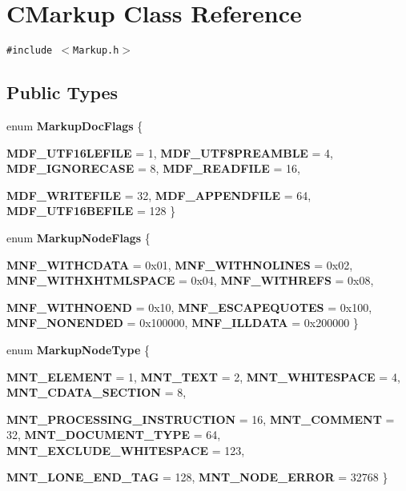 \section{CMarkup Class Reference}
\label{classCMarkup}
{\tt \#include $<$Markup.h$>$}

\subsection*{Public Types}
\begin{CompactItemize}
\item 
enum {\bf MarkupDocFlags} \{ \par
{\bf MDF\_\-UTF16LEFILE} =  1, 
{\bf MDF\_\-UTF8PREAMBLE} =  4, 
{\bf MDF\_\-IGNORECASE} =  8, 
{\bf MDF\_\-READFILE} =  16, 
\par
{\bf MDF\_\-WRITEFILE} =  32, 
{\bf MDF\_\-APPENDFILE} =  64, 
{\bf MDF\_\-UTF16BEFILE} =  128
 \}
\item 
enum {\bf MarkupNodeFlags} \{ \par
{\bf MNF\_\-WITHCDATA} =  0x01, 
{\bf MNF\_\-WITHNOLINES} =  0x02, 
{\bf MNF\_\-WITHXHTMLSPACE} =  0x04, 
{\bf MNF\_\-WITHREFS} =  0x08, 
\par
{\bf MNF\_\-WITHNOEND} =  0x10, 
{\bf MNF\_\-ESCAPEQUOTES} =  0x100, 
{\bf MNF\_\-NONENDED} =  0x100000, 
{\bf MNF\_\-ILLDATA} =  0x200000
 \}
\item 
enum {\bf MarkupNodeType} \{ \par
{\bf MNT\_\-ELEMENT} =  1, 
{\bf MNT\_\-TEXT} =  2, 
{\bf MNT\_\-WHITESPACE} =  4, 
{\bf MNT\_\-CDATA\_\-SECTION} =  8, 
\par
{\bf MNT\_\-PROCESSING\_\-INSTRUCTION} =  16, 
{\bf MNT\_\-COMMENT} =  32, 
{\bf MNT\_\-DOCUMENT\_\-TYPE} =  64, 
{\bf MNT\_\-EXCLUDE\_\-WHITESPACE} =  123, 
\par
{\bf MNT\_\-LONE\_\-END\_\-TAG} =  128, 
{\bf MNT\_\-NODE\_\-ERROR} =  32768
 \}
\end{CompactItemize}
